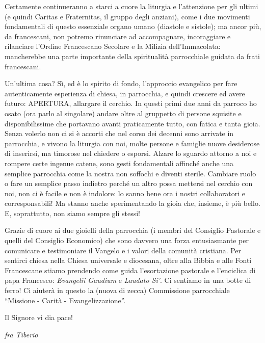 Certamente continueranno a starci a cuore la liturgia e l’attenzione per gli ultimi (e quindi 
Caritas e Fraternitas, il gruppo degli anziani), come i due movimenti fondamentali di questo 
essenziale organo umano (diastole e sistole); ma ancor più, da francescani, non potremo rinunciare 
ad accompagnare, incoraggiare e rilanciare l’Ordine Francescano Secolare e la Milizia 
dell’Immacolata: mancherebbe una parte importante della spiritualità parrocchiale guidata da frati 
francescani.

Un’ultima cosa? Sì, ed è lo spirito di fondo, l’approccio evangelico per fare autenticamente 
esperienza di chiesa, in parrocchia, e quindi crescere ed avere futuro: APERTURA, allargare il 
cerchio. In questi primi due anni da parroco ho osato (ora parlo al singolare) andare oltre al 
gruppetto di persone squisite e disponibilissime che portavano avanti praticamente tutto, con fatica 
e tanta gioia. Senza volerlo non ci si è accorti che nel corso dei decenni sono arrivate in parrocchia, 
e vivono la liturgia con noi, molte persone e famiglie nuove desiderose di inserirsi, ma timorose nel 
chiedere o esporsi. Alzare lo sguardo attorno a noi e rompere certe ingenue catene, sono gesti 
fondamentali affinché anche una semplice parrocchia come la nostra non soffochi e diventi sterile. 
Cambiare ruolo o fare un semplice passo indietro perché un altro possa mettersi nel cerchio con noi, 
non ci è facile e non è indolore: lo sanno bene ora i nostri collaboratori e corresponsabili! Ma stanno 
anche sperimentando la gioia che, insieme, è più bello. E, soprattutto, non siamo sempre gli stessi!

Grazie di cuore ai due gioielli della parrocchia (i membri del Consiglio Pastorale e quelli del 
Consiglio Economico) che sono davvero una forza entusiasmante per comunicare e testimoniare il 
Vangelo e i valori della comunità cristiana. Per sentirci chiesa nella Chiesa universale e diocesana, 
oltre alla Bibbia e alle Fonti Francescane stiamo prendendo come guida l’esortazione pastorale e 
l’enciclica di papa Francesco: \textit{Evangelii Gaudium} e \textit{Laudato Si’}. Ci sentiamo in una botte di ferro! 
Ci aiuterà in questo la (nuova di zecca) Commissione parrocchiale “Missione - Carità - 
Evangelizzazione”.

Il Signore vi dia pace!
\begin{flushright}
\textit{fra Tiberio}
\end{flushright}
\endgroup
